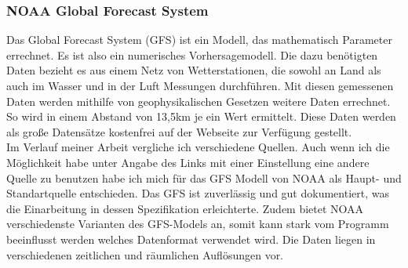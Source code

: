 \subsubsection*{NOAA Global Forecast System} %
Das Global Forecast System (GFS)  ist ein Modell, das mathematisch Parameter errechnet.
Es ist also ein numerisches Vorhersagemodell.
Die dazu benötigten Daten bezieht es aus einem Netz von Wetterstationen,
die sowohl an Land als auch im Wasser und in der Luft Messungen durchführen.
Mit diesen gemessenen Daten werden mithilfe von geophysikalischen Gesetzen weitere Daten errechnet.
So wird in einem Abstand von 13,5km je ein Wert ermittelt.
Diese Daten werden als große Datensätze kostenfrei auf
der Webseite  \cite{ncep} zur Verfügung gestellt.\\
Im Verlauf meiner Arbeit vergliche ich verschiedene Quellen.
Auch wenn ich die Möglichkeit habe unter Angabe des Links mit einer
Einstellung eine andere Quelle zu benutzen habe ich mich
für das GFS Modell von NOAA als Haupt- und Standartquelle entschieden.
Das GFS ist zuverlässig und gut dokumentiert,
was die Einarbeitung in dessen Spezifikation erleichterte.
Zudem bietet NOAA verschiedenste Varianten des GFS-Models an,
somit kann stark vom Programm beeinflusst werden welches
Datenformat verwendet wird.
Die Daten liegen in verschiedenen zeitlichen und räumlichen Auflösungen vor.

